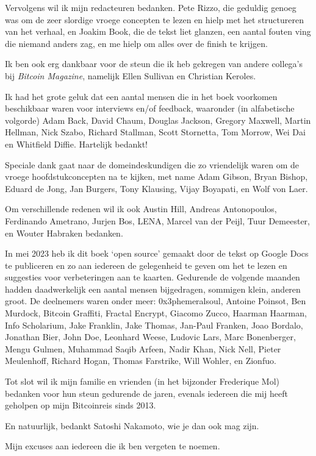 \documentclass[smalldemyvopaper,11pt,twoside,onecolumn,openright,extrafontsizes,hidelinks]{memoir}
\begin{document}
Vervolgens wil ik mijn redacteuren bedanken. Pete Rizzo, die geduldig
genoeg was om de zeer slordige vroege concepten te lezen en hielp met
het structureren van het verhaal, en Joakim Book, die de tekst liet
glanzen, een aantal fouten ving die niemand anders zag, en me hielp om
alles over de finish te krijgen.

Ik ben ook erg dankbaar voor de steun die ik heb gekregen van andere
collega's bij \emph{Bitcoin Magazine}, namelijk Ellen Sullivan en
Christian Keroles.

Ik had het grote geluk dat een aantal mensen die in het boek voorkomen
beschikbaar waren voor interviews en/of feedback, waaronder (in
alfabetische volgorde) Adam Back, David Chaum, Douglas Jackson, Gregory
Maxwell, Martin Hellman, Nick Szabo, Richard Stallman, Scott Stornetta,
Tom Morrow, Wei Dai en Whitfield Diffie. Hartelijk bedankt!

Speciale dank gaat naar de domeindeskundigen die zo vriendelijk waren om
de vroege hoofdstukconcepten na te kijken, met name Adam Gibson, Bryan
Bishop, Eduard de Jong, Jan Burgers, Tony Klausing, Vijay Boyapati, en
Wolf von Laer.

Om verschillende redenen wil ik ook Austin Hill, Andreas Antonopoulos,
Ferdinando Ametrano, Jurjen Bos, LENA, Marcel van der Peijl, Tuur
Demeester, en Wouter Habraken bedanken.

In mei 2023 heb ik dit boek `open source' gemaakt door de tekst op
Google Docs te publiceren en zo aan iedereen de gelegenheid te geven om
het te lezen en suggesties voor verbeteringen aan te kaarten. Gedurende
de volgende maanden hadden daadwerkelijk een aantal mensen bijgedragen,
sommigen klein, anderen groot. De deelnemers waren onder meer:
0x3phemeralsoul, Antoine Poinsot, Ben Murdock, Bitcoin Graffiti, Fractal
Encrypt, Giacomo Zucco, Haarman Haarman, Info Scholarium, Jake Franklin,
Jake Thomas, Jan-Paul Franken, Joao Bordalo, Jonathan Bier, John Doe,
Leonhard Weese, Ludovic Lars, Marc Bonenberger, Mengu Gulmen, Muhammad
Saqib Arfeen, Nadir Khan, Nick Nell, Pieter Meulenhoff, Richard Hogan,
Thomas Farstrike, Will Wohler, en Zionfuo.

Tot slot wil ik mijn familie en vrienden (in het bijzonder Frederique
Mol) bedanken voor hun steun gedurende de jaren, evenals iedereen die
mij heeft geholpen op mijn Bitcoinreis sinds 2013.

En natuurlijk, bedankt Satoshi Nakamoto, wie je dan ook mag zijn.

Mijn excuses aan iedereen die ik ben vergeten te noemen.
\end{document}
